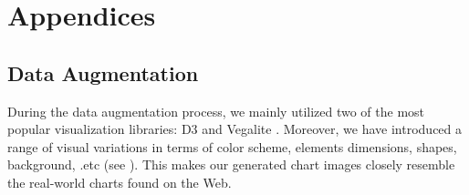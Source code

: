 \appendix
\section{Appendices}



\subsection{Data Augmentation}
During the data augmentation process, we mainly utilized two of the most popular visualization libraries: D3 \cite{d3} and Vegalite \cite{vegalite}. Moreover, we have introduced a range of visual variations in terms of color scheme, elements dimensions, shapes, background, .etc (see ).  This makes our generated chart images closely resemble the real-world charts found on the Web. 

